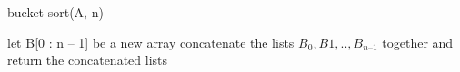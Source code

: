\begin{algbox}{bucket-sort(A, n)}
  \begin{algorithm}[H]
    	let B[0 : n – 1] be a new array
	\For{ $i \leftarrow [1, n]$}{
	    insert $A_{i}$ into list $B_{ \lfloor n A_{i} \rfloor} ]$
       	}
	concatenate the lists $B_{0}, B{1}, .. , B_{n – 1}$ together and\\
	return the concatenated lists
  \end{algorithm}
\end{algbox}



